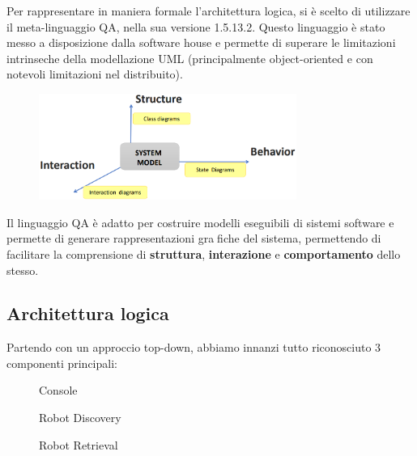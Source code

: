 Per rappresentare in maniera formale l'architettura logica, si è scelto di utilizzare il meta-linguaggio QA, nella sua versione 1.5.13.2.
Questo linguaggio è stato messo a disposizione dalla software house e permette di superare le limitazioni intrinseche della modellazione UML
(principalmente object-oriented e con notevoli limitazioni nel distribuito).

\begin{figure}[htbp]
  \centering
  \includegraphics[width=0.75\textwidth]{res/logicalArchitecture.png}%
  \label{fig:logicalArchitecture}
\end{figure}

Il linguaggio QA è adatto per costruire modelli eseguibili di sistemi software e permette di generare rappresentazioni grafiche del sistema,
permettendo di facilitare la comprensione di \textbf{struttura}, \textbf{interazione} e \textbf{comportamento} dello stesso.

\subsection{Architettura logica}

Partendo con un approccio top-down, abbiamo innanzi tutto riconosciuto 3 componenti principali:

\begin{figure}[htbp]
  \centering
  \caption{Console}%
  \label{fig:sp1:console}
\end{figure}

\begin{figure}[htbp]
  \centering
  \caption{Robot Discovery}%
  \label{fig:sp1:robotdiscovery}
\end{figure}

\begin{figure}[htbp]
  \centering
  \caption{Robot Retrieval}%
  \label{fig:sp1:robotretrieval}
\end{figure}

